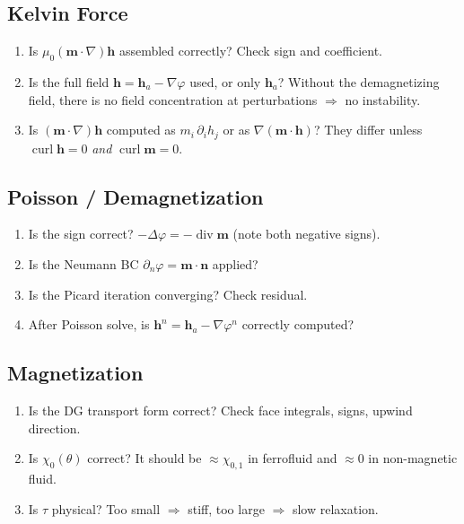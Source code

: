 \documentclass[11pt,a4paper]{article}
\theoremstyle{definition}
\theoremstyle{remark}
\newcommand{\dn}{\partial_n}
\newcommand{\dv}{\operatorname{div}}
\newcommand{\curl}{\operatorname{curl}}
\newcommand{\grad}{\nabla}
\newcommand{\bfm}{\bm{m}}
\newcommand{\bfh}{\bm{h}}
\newcommand{\bfn}{\bm{n}}
\begin{document}
\subsection{Kelvin Force}
\begin{enumerate}[label=(\alph*)]
  \item Is $\mu_0(\bfm\cdot\grad)\bfh$ assembled correctly? Check sign
        and coefficient.
  \item Is the full field $\bfh = \bfh_a - \grad\varphi$ used, or only
        $\bfh_a$? Without the demagnetizing field, there is no field
        concentration at perturbations $\Rightarrow$ no instability.
  \item Is $(\bfm\cdot\grad)\bfh$ computed as
        $m_i\,\partial_i h_j$ or as $\grad(\bfm\cdot\bfh)$?
        They differ unless $\curl\bfh = 0$ \emph{and} $\curl\bfm = 0$.
\end{enumerate}

\subsection{Poisson / Demagnetization}
\begin{enumerate}[label=(\alph*)]
  \item Is the sign correct? $-\Delta\varphi = -\dv\bfm$ (note both
        negative signs).
  \item Is the Neumann BC $\dn\varphi = \bfm\cdot\bfn$ applied?
  \item Is the Picard iteration converging? Check residual.
  \item After Poisson solve, is $\bfh^n = \bfh_a - \grad\varphi^n$
        correctly computed?
\end{enumerate}

\subsection{Magnetization}
\begin{enumerate}[label=(\alph*)]
  \item Is the DG transport form correct? Check face integrals, signs,
        upwind direction.
  \item Is $\chi_0(\theta)$ correct? It should be $\approx \chi_{0,1}$
        in ferrofluid and $\approx 0$ in non-magnetic fluid.
  \item Is $\tau$ physical? Too small $\Rightarrow$ stiff, too large
        $\Rightarrow$ slow relaxation.
\end{enumerate}
\end{document}
